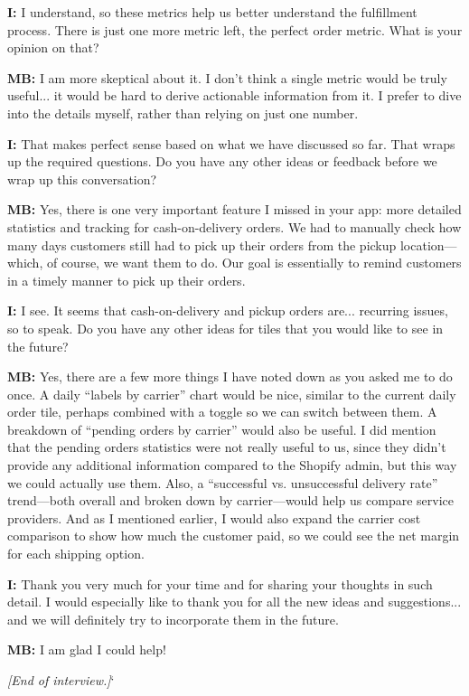 \documentclass{imc-inf}
\begin{document}
\begin{appendices}
  \noindent\textbf{I:} I understand, so these metrics help us better understand the fulfillment process. There is just one more metric left, the perfect order metric. What is your opinion on that?

  \noindent\textbf{MB:} I am more skeptical about it. I don't think a single metric would be truly useful... it would be hard to derive actionable information from it. I prefer to dive into the details myself, rather than relying on just one number.

  \noindent\textbf{I:} That makes perfect sense based on what we have discussed so far. That wraps up the required questions. Do you have any other ideas or feedback before we wrap up this conversation?

  \noindent\textbf{MB:} Yes, there is one very important feature I missed in your app: more detailed statistics and tracking for cash-on-delivery orders. We had to manually check how many days customers still had to pick up their orders from the pickup location—which, of course, we want them to do. Our goal is essentially to remind customers in a timely manner to pick up their orders.

  \noindent\textbf{I:} I see. It seems that cash-on-delivery and pickup orders are... recurring issues, so to speak. Do you have any other ideas for tiles that you would like to see in the future?

  \noindent\textbf{MB:} Yes, there are a few more things I have noted down as you asked me to do once. A daily “labels by carrier” chart would be nice, similar to the current daily order tile, perhaps combined with a toggle so we can switch between them. A breakdown of “pending orders by carrier” would also be useful. I did mention that the pending orders statistics were not really useful to us, since they didn’t provide any additional information compared to the Shopify admin, but this way we could actually use them.  Also, a “successful vs. unsuccessful delivery rate” trend—both overall and broken down by carrier—would help us compare service providers. And as I mentioned earlier, I would also expand the carrier cost comparison to show how much the customer paid, so we could see the net margin for each shipping option.

  \noindent\textbf{I:} Thank you very much for your time and for sharing your thoughts in such detail. I would especially like to thank you for all the new ideas and suggestions... and we will definitely try to incorporate them in the future.

  \noindent\textbf{MB:} I am glad I could help!

  \bigskip
  \noindent\textit{[End of interview.]}`

\end{appendices}
\end{document}
